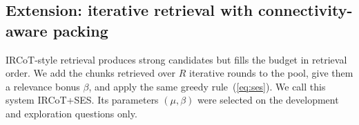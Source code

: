 \subsection{Extension: iterative retrieval with connectivity-aware packing}
IRCoT-style retrieval produces strong candidates but fills the budget in retrieval order. We add the chunks retrieved over $R$ iterative rounds to the pool, give them a relevance bonus $\beta$, and apply the same greedy rule~(\ref{eq:ses}). We call this system IRCoT+SES. Its parameters $(\mu,\beta)$ were selected on the development and exploration questions only.
